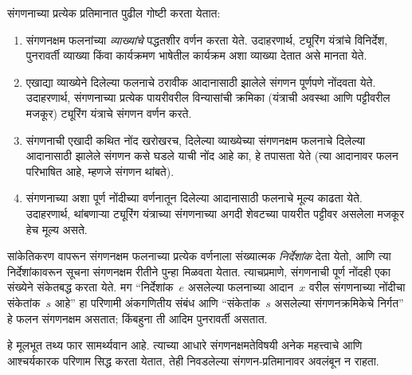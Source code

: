 \documentclass[../../../include/open-logic-section]{subfiles}
\begin{document}

संगणनाच्या प्रत्येक प्रतिमानात पुढील गोष्टी करता येतात:
\begin{enumerate}
\item संगणनक्षम फलनांच्या \emph{व्याख्यांचे} पद्धतशीर वर्णन करता येते.
  उदाहरणार्थ, ट्यूरिंग यंत्रांचे विनिर्देश, पुनरावर्ती व्याख्या किंवा
  कार्यक्रमण भाषेतील कार्यक्रम अशा व्याख्या देतात असे मानता येते.
\item एखाद्या व्याख्येने दिलेल्या फलनाचे ठरावीक आदानासाठी झालेले
  संगणन पूर्णपणे नोंदवता येते. उदाहरणार्थ, संगणनाच्या प्रत्येक पायरीवरील
  विन्यासांची क्रमिका (यंत्राची अवस्था आणि पट्टीवरील मजकूर) ट्यूरिंग
  यंत्राचे संगणन वर्णन करते.
\item संगणनाची एखादी कथित नोंद खरोखरच, दिलेल्या व्याख्येच्या
  संगणनक्षम फलनाचे दिलेल्या आदानासाठी झालेले संगणन कसे घडले याची नोंद
  आहे का, हे तपासता येते (त्या आदानावर फलन परिभाषित आहे, म्हणजे
  संगणन थांबते).
\item संगणनाच्या अशा पूर्ण नोंदीच्या वर्णनातून दिलेल्या आदानासाठी
  फलनाचे मूल्य काढता येते. उदाहरणार्थ, थांबणाऱ्या ट्यूरिंग यंत्राच्या
  संगणनाच्या अगदी शेवटच्या पायरीत पट्टीवर असलेला मजकूर हेच मूल्य असते.
\end{enumerate}

सांकेतिकरण वापरून संगणनक्षम फलनाच्या प्रत्येक वर्णनाला संख्यात्मक
\emph{निर्देशांक} देता येतो, आणि त्या निर्देशांकावरून सूचना संगणनक्षम
रीतीने पुन्हा मिळवता येतात. त्याचप्रमाणे, संगणनाची पूर्ण नोंदही एका
संख्येने संकेतबद्ध करता येते. मग ``निर्देशांक~$e$ असलेल्या फलनाच्या
आदान~$x$ वरील संगणनाच्या नोंदीचा संकेतांक~$s$ आहे'' हा परिणामी
अंकगणितीय संबंध आणि ``संकेतांक~$s$ असलेल्या संगणनक्रमिकेचे निर्गत''
हे फलन संगणनक्षम असतात; किंबहुना ती आदिम पुनरावर्ती असतात.

हे मूलभूत तथ्य फार सामर्थ्यवान आहे. त्याच्या आधारे संगणनक्षमतेविषयी
अनेक महत्त्वाचे आणि आश्चर्यकारक परिणाम सिद्ध करता येतात, तेही निवडलेल्या
संगणन-प्रतिमानावर अवलंबून न राहता.
\end{document}
